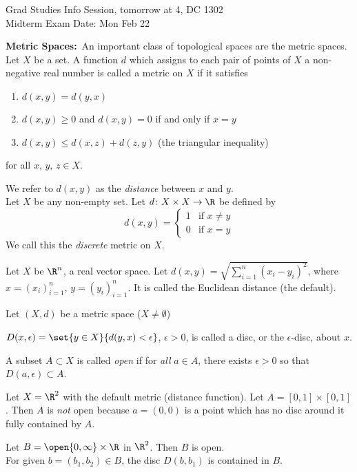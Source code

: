 Grad Studies Info Session, tomorrow at 4, DC 1302 \\
Midterm Exam Date: Mon Feb 22 %

\textbf{Metric Spaces:}~An important class of topological spaces are the metric spaces. \\
 Let $X$ be a set.  A function $d$ which assigns to each pair of points of $X$ a non-negative real number is called a metric on $X$ if it satisfies
\begin{enumerate}
\item $d(x,y)=d(y,x)$
\item $d(x,y)\geq0$ and $d(x,y)=0$ if and only if $x=y$
\item $d(x,y)\leq d(x,z)+d(z,y)$ (the triangular inequality)
\end{enumerate}
for all $x$, $y$, $z\in X$.

We refer to $d(x,y)$ as the \emph{distance} between $x$ and $y$. \\
\egs Let $X$ be any non-empty set.  Let $d\colon X\times X\to\R$ be defined by
\[ d(x,y) = \begin{cases}
1 & \text{if $x\neq y$} \\
0 & \text{if $x=y$}
\end{cases} \]
We call this the \emph{discrete} metric on $X$.

Let $X$ be $\R^n$, a real vector space.  Let $d(x,y)=\sqrt{\sum_{i=1}^n(x_i-y_i)^2}$, where $x=(x_i)_{i=1}^n$, $y=(y_i)_{i=1}^n$.  It is called the Euclidean distance (the default).

Let $(X,d)$ be a metric space ($X\neq\emptyset$)

$D(x,\epsilon)=\set{y\in X}{d(y,x)<\epsilon}$, $\epsilon>0$, is called a disc, or the $\epsilon$-disc, about $x$.

A subset $A\subset X$ is called \emph{open} if for \emph{all} $a\in A$, there exists $\epsilon>0$ so that $D(a,\epsilon)\subset A$.

\eg Let $X=\R^2$ with the default metric (distance function).  Let $A=[0,1]\times[0,1]$.  Then $A$ is \emph{not} open because $a=(0,0)$ is a point which has no disc around it fully contained by $A$.

Let $B=\open{0,\infty}\times\R$ in $\R^2$.  Then $B$ is open. \\
For given $b=(b_1,b_2)\in B$, the disc $D(b,b_1)$ is contained in $B$.

